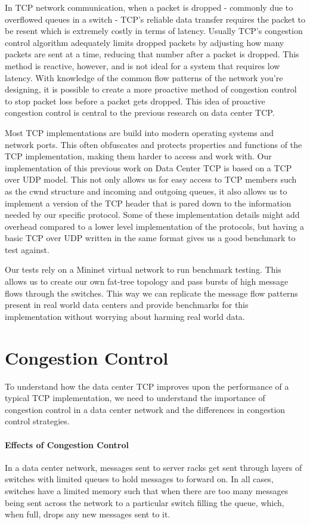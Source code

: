 \documentclass[%
 reprint,
amsmath,amssymb,
aps,
]{revtex4-2}
\begin{document}
In TCP network communication, when a packet is dropped - commonly due to overflowed queues in a switch - TCP's reliable data transfer requires the packet to be resent which is extremely costly in terms of latency. Usually TCP's congestion control algorithm adequately limits dropped packets by adjusting how many packets are sent at a time, reducing that number after a packet is dropped. This method is reactive, however, and is not ideal for a system that requires low latency. With knowledge of the common flow patterns of the network you're designing, it is possible to create a more proactive method of congestion control to stop packet loss before a packet gets dropped. This idea of proactive congestion control is central to the previous research on data center TCP.

Most TCP implementations are build into modern operating systems and network ports. This often obfuscates and protects properties and functions of the TCP implementation, making them harder to access and work with. Our implementation of this previous work on Data Center TCP is based on a TCP over UDP model. This not only allows us for easy access to TCP members such as the cwnd structure and incoming and outgoing queues, it also allows us to implement a version of the TCP header that is pared down to the information needed by our specific protocol. Some of these implementation details might add overhead compared to a lower level implementation of the protocols, but having a basic TCP over UDP written in the same format gives us a good benchmark to test against.

Our tests rely on a Mininet virtual network to run benchmark testing. This allows us to create our own fat-tree topology and pass bursts of high message flows through the switches. This way we can replicate the message flow patterns present in real world data centers and provide benchmarks for this implementation without worrying about harming real world data.

\section{Congestion Control}
To understand how the data center TCP improves upon the performance of a typical TCP implementation, we need to understand the importance of congestion control in a data center network and the differences in congestion control strategies. 
\paragraph{Effects of Congestion Control}
In a data center network, messages sent to  server racks get sent through layers of switches with limited queues to hold messages to forward on. In all cases, switches have a limited memory such that when there are too many messages being sent across the network to a particular switch filling the queue, which, when full, drops any new messages sent to it.
\end{document}
